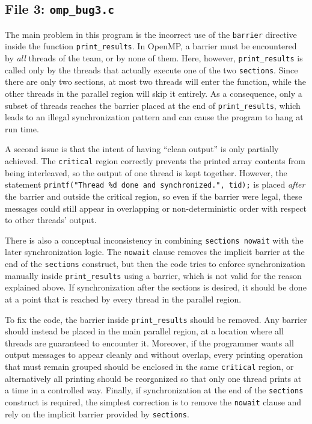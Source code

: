 \documentclass[unicode,10pt,a4paper,oneside,numbers=endperiod,openany]{scrartcl}
\begin{document}
\subsection{File 3: \texttt{omp\_bug3.c}}
The main problem in this program is the incorrect use of the \texttt{barrier} directive inside the function \texttt{print\_results}. In OpenMP, a barrier must be encountered by \emph{all} threads of the team, or by none of them. Here, however, \texttt{print\_results} is called only by the threads that actually execute one of the two \texttt{sections}. Since there are only two sections, at most two threads will enter the function, while the other threads in the parallel region will skip it entirely. As a consequence, only a subset of threads reaches the barrier placed at the end of \texttt{print\_results}, which leads to an illegal synchronization pattern and can cause the program to hang at run time.

A second issue is that the intent of having ``clean output'' is only partially achieved. The \texttt{critical} region correctly prevents the printed array contents from being interleaved, so the output of one thread is kept together. However, the statement \texttt{printf("Thread \%d done and synchronized.\n", tid);}
is placed \emph{after} the barrier and outside the critical region, so even if the barrier were legal, these messages could still appear in overlapping or non-deterministic order with respect to other threads' output.

There is also a conceptual inconsistency in combining \texttt{sections nowait} with the later synchronization logic. The \texttt{nowait} clause removes the implicit barrier at the end of the \texttt{sections} construct, but then the code tries to enforce synchronization manually inside \texttt{print\_results} using a barrier, which is not valid for the reason explained above. If synchronization after the sections is desired, it should be done at a point that is reached by every thread in the parallel region.

To fix the code, the barrier inside \texttt{print\_results} should be removed. Any barrier should instead be placed in the main parallel region, at a location where all threads are guaranteed to encounter it. Moreover, if the programmer wants all output messages to appear cleanly and without overlap, every printing operation that must remain grouped should be enclosed in the same \texttt{critical} region, or alternatively all printing should be reorganized so that only one thread prints at a time in a controlled way. Finally, if synchronization at the end of the \texttt{sections} construct is required, the simplest correction is to remove the \texttt{nowait} clause and rely on the implicit barrier provided by \texttt{sections}.
\end{document}

